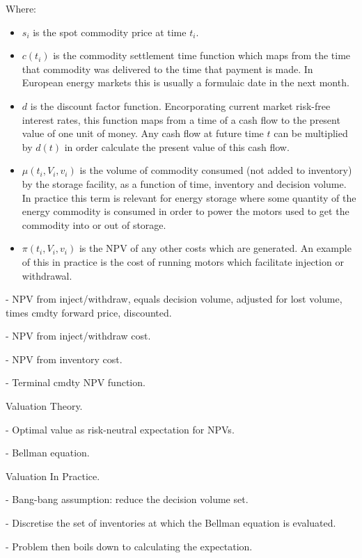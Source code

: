 \documentclass{article}
\begin{document}
Where:
\begin{itemize}
    \item $s_i$ is the spot commodity price at time $t_i$.
    \item $c(t_i)$ is the commodity settlement time function which maps from the 
    time that commodity was delivered to the time that payment is made. In European
    energy markets this is usually a formulaic date in the next month.
    \item $d$ is the discount factor function. Encorporating current market risk-free
    interest rates, this function maps from a time of a cash flow to the present value
    of one unit of money. Any cash flow at future time $t$ can be multiplied by $d(t)$
    in order calculate the present value of this cash flow.
    \item $\mu(t_i, V_i, v_i)$ is the volume of commodity consumed (not added to inventory)
    by the storage facility, as a function of time, inventory and decision volume. In practice
    this term is relevant for energy storage where some quantity of the energy commodity
    is consumed in order to power the motors used to get the commodity into or out of storage.
    \item $\pi(t_i, V_i, v_i)$ is the NPV of any other costs which are generated. An example of
    this in practice is the cost of running motors which facilitate injection or withdrawal.
\end{itemize}

- NPV from inject/withdraw, equals decision volume, adjusted for lost volume,
times cmdty forward price, discounted.

- NPV from inject/withdraw cost.

- NPV from inventory cost.

- Terminal cmdty NPV function.

\bigskip

Valuation Theory.

- Optimal value as risk-neutral expectation for NPVs.

- Bellman equation.

\bigskip

Valuation In Practice.

- Bang-bang assumption: reduce the decision volume set.

- Discretise the set of inventories at which the Bellman equation is evaluated.

- Problem then boils down to calculating the expectation.
\end{document}
